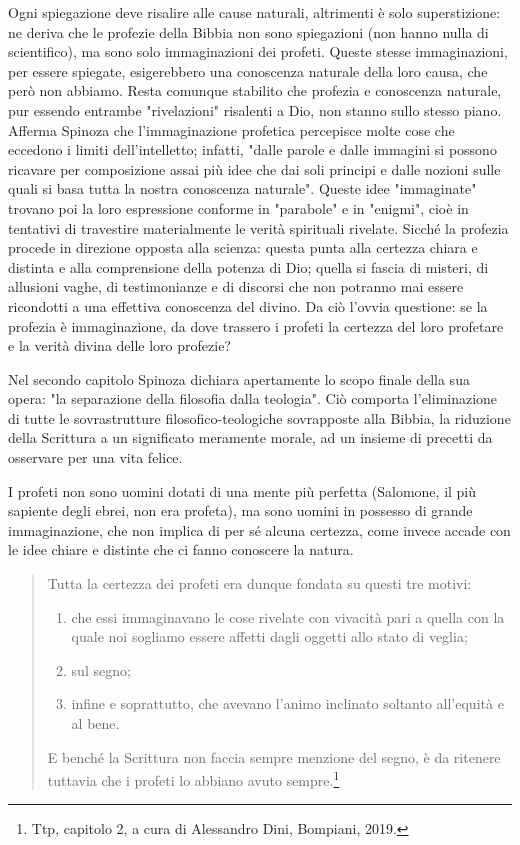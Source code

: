 Ogni spiegazione deve risalire alle cause naturali, altrimenti
è solo superstizione: ne deriva che le profezie della Bibbia non
sono spiegazioni (non hanno nulla di scientifico), ma sono solo immaginazioni dei profeti. Queste
stesse immaginazioni, per essere spiegate, esigerebbero una conoscenza naturale della loro causa,
che però non abbiamo. Resta comunque stabilito che profezia e conoscenza naturale, pur essendo
entrambe "rivelazioni" risalenti a Dio, non stanno sullo
stesso piano. Afferma Spinoza che l'immaginazione profetica percepisce
molte cose che eccedono i limiti dell'intelletto; infatti, "dalle parole e dalle immagini si possono
ricavare per composizione assai più idee che dai soli principi e dalle nozioni sulle quali si basa tutta
la nostra conoscenza naturale". Queste idee "immaginate" trovano poi la loro espressione
conforme in "parabole" e in "enigmi", cioè in tentativi di travestire materialmente le verità spirituali
rivelate. Sicché la profezia procede in direzione opposta alla scienza: questa punta alla
certezza chiara e distinta e alla comprensione della potenza di Dio; quella si fascia di misteri, di allusioni vaghe, di testimonianze e di discorsi che non potranno
mai essere ricondotti a una effettiva conoscenza del divino. Da ciò l'ovvia questione: se
la profezia è immaginazione,
da dove trassero i profeti la certezza del loro profetare e la verità divina
delle loro profezie?

Nel secondo capitolo Spinoza dichiara apertamente lo scopo finale della sua opera: "la separazione della filosofia dalla teologia". Ciò comporta l'eliminazione di tutte le sovrastrutture filosofico-teologiche sovrapposte alla Bibbia, la riduzione della
Scrittura a un significato meramente morale, ad un insieme di precetti da osservare per una vita felice.

I profeti non sono uomini dotati di una mente più perfetta
(Salomone, il più sapiente degli ebrei, non era profeta), ma sono uomini in possesso di grande immaginazione, che non implica di per sé alcuna certezza, come invece accade con le idee chiare e
distinte che ci fanno conoscere la natura.

\begin{quotation}
	\small Tutta la certezza dei profeti era dunque fondata su questi tre motivi: 
	\begin{enumerate}
		\item che essi
		immaginavano le cose rivelate con vivacità pari a quella con la quale noi sogliamo essere affetti
		dagli oggetti allo stato di veglia;
		\item sul segno;
		\item infine e soprattutto, che avevano l'animo inclinato
		soltanto all'equità e al bene.
	\end{enumerate}
	
	E benché la Scrittura non faccia sempre menzione del segno, è da
	ritenere tuttavia che i profeti lo abbiano avuto sempre.\footnote{Ttp, capitolo 2, a cura di Alessandro Dini, Bompiani, 2019.}
\end{quotation}

